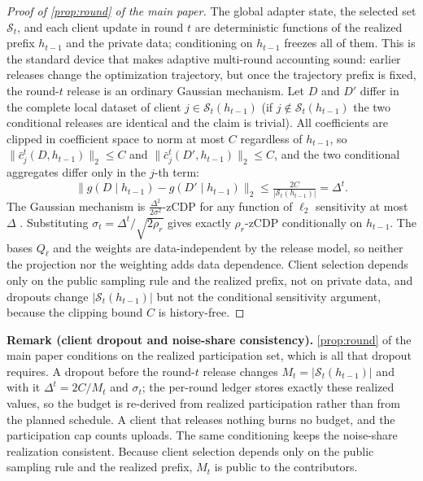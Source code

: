 \documentclass[a4paper,fleqn]{cas-dc}
\begin{document}
\begin{proof}[Proof of \cref{prop:round} of the main paper]
The global adapter state, the selected set $\mathcal{S}_t$, and each client
update in round $t$ are deterministic functions of the realized prefix
$h_{t-1}$ and the private data; conditioning on $h_{t-1}$ freezes all of
them. This is the standard device that makes adaptive multi-round accounting
sound: earlier releases change the optimization trajectory, but once the
trajectory prefix is fixed, the round-$t$ release is an ordinary Gaussian
mechanism. Let $D$ and $D'$ differ in the complete local dataset of client
$j\in\mathcal{S}_t(h_{t-1})$ (if $j\notin\mathcal{S}_t(h_{t-1})$ the two
conditional releases are identical and the claim is trivial). All
coefficients are clipped in coefficient space to norm at most $C$ regardless
of $h_{t-1}$, so $\|\bar c_j^t(D,h_{t-1})\|_2\le C$ and
$\|\bar c_j^t(D',h_{t-1})\|_2\le C$, and the two conditional aggregates
differ only in the $j$-th term:
\begin{equation}
\big\|g(D\mid h_{t-1})-g(D'\mid h_{t-1})\big\|_2\le
\tfrac{2C}{|\mathcal{S}_t(h_{t-1})|}=\Delta^t .
\end{equation}
The Gaussian mechanism is $\tfrac{\Delta^2}{2\sigma^2}$-zCDP for any function
of $\ell_2$ sensitivity at most $\Delta$ \cite{bun2016concentrated}.
Substituting $\sigma_t=\Delta^t/\sqrt{2\rho_r}$ gives exactly $\rho_r$-zCDP
conditionally on $h_{t-1}$. The bases $Q_\ell$ and the weights are
data-independent by the release model, so neither the projection nor the
weighting adds data dependence. Client selection depends only on the public
sampling rule and the realized prefix, not on private data, and dropouts
change $|\mathcal{S}_t(h_{t-1})|$ but not the conditional sensitivity
argument, because the clipping bound $C$ is history-free.
\end{proof}
\textbf{Remark (client dropout and noise-share consistency).}
\cref{prop:round} of the main paper conditions on the realized participation set,
which is all that dropout requires. A dropout before the round-$t$ release
changes $M_t=|\mathcal{S}_t(h_{t-1})|$ and with it $\Delta^t=2C/M_t$ and
$\sigma_t$; the per-round ledger stores exactly these realized values, so the
budget is re-derived from realized participation rather than from the planned
schedule. A client that releases nothing burns no budget, and the
participation cap counts uploads. The same conditioning keeps the noise-share
realization consistent. Because client selection depends only on the public
sampling rule and the realized prefix, $M_t$ is public to the contributors.
\end{document}
